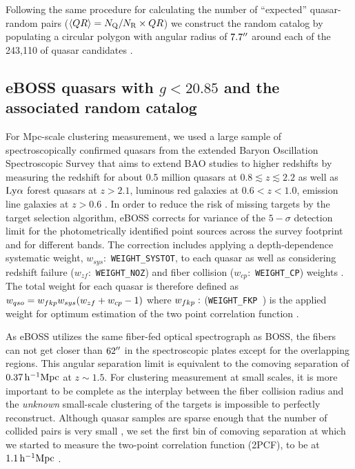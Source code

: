 \documentclass[useAMS,usenatbib]{mn2e}
\begin{document}
Following the same procedure for calculating the number of ``expected'' quasar-random pairs ($\langle QR \rangle = N_{\rm Q}/N_{\rm R} \times QR$) we construct the random catalog by populating a circular polygon with angular radius of $7.7\arcsec$ around each of the 243{,}110 of quasar candidates \citep[see section 3.1 of][for a detailed description of the taken steps]{ef17}. 


\subsection{eBOSS quasars with $g<20.85$ and the associated random catalog}\label{ldat}

For Mpc-scale clustering measurement, we used a large sample of spectroscopically confirmed quasars from the extended Baryon Oscillation Spectroscopic Survey \citep[eBOSS;][]{daw16} that aims to extend BAO studies to higher redshifts by measuring the redshift for about 0.5 million quasars at $0.8\lesssim z \lesssim 2.2$ as well as $\rm Ly\alpha$ forest quasars at $z>2.1$, luminous red galaxies at $0.6<z<1.0$, emission line galaxies at $z>0.6$ \citep[see ][for target selection criteria and process]{my15}. In order to reduce the risk of missing targets by the target selection algorithm, eBOSS corrects for variance of the $5-\sigma$ detection limit for the photometrically identified point sources across the survey footprint and for different bands. The correction includes applying a depth-dependence systematic weight, $w_{sys}:$ {\tt WEIGHT\_SYSTOT}, to each quasar as well as considering redshift failure ($w_{zf}:$ {\tt WEIGHT\_NOZ}) and fiber collision ($w_{cp}:$ {\tt WEIGHT\_CP}) weights \citep[see, ][for detail of the weight determination]{la17,rod17,bp17,an12,ross12}. The total weight for each quasar is therefore defined as $w_{qso} = w_{\sc fkp}w_{sys}(w_{zf}+w_{cp}-1)$ where $w_{\sc fkp}:$ ({\tt WEIGHT\_FKP  }) is the applied weight for optimum estimation of the two point correlation function \citep[see, ][]{fkp94}.


As eBOSS utilizes the same fiber-fed optical spectrograph as BOSS, the fibers can not get closer than $62 \arcsec$ in the spectroscopic plates except for the overlapping regions\citep{bl03}. This angular separation limit is equivalent to the comoving separation of $0.37\, \rm h^{-1}Mpc$ at $z\sim 1.5$. For clustering measurement at small scales, it is more important to be complete as the interplay between the fiber collision radius and the {\it unknown} small-scale clustering of the targets is impossible to perfectly reconstruct. Although quasar samples are sparse enough that the number of collided pairs is very small \citep[e.g.,][]{rod17}, we set the first bin of comoving separation at which we started to measure the two-point correlation function (2PCF), to be at $1.1 \, \rm h^{-1}Mpc$ \citep[see, e. g., ][for studies on the efficiency of fiber collision corrections at small scales]{gu12,ha17}. 
\end{document}
